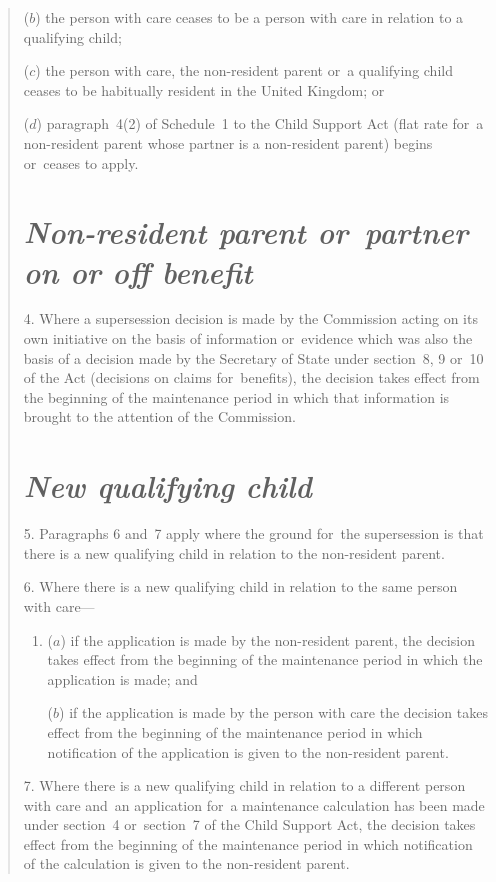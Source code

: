 \documentclass[12pt,a4paper]{article}
\begin{document}
\begin{quotation}
\begin{enumerate}
($b$) the person with care ceases to be a person with care in relation to a qualifying child;

($c$) the person with care, the non-resident parent or~a qualifying child ceases to be habitually resident in the United Kingdom; or

($d$) paragraph~4(2) of Schedule~1 to the Child Support Act (flat rate for~a non-resident parent whose partner is a non-resident parent) begins or~ceases to apply.
\end{enumerate}

\section*{\itshape Non-resident parent or~partner on or off benefit}

4.  Where a supersession decision is made by the Commission acting on its own initiative on the basis of information or~evidence which was also the basis of a decision made by the Secretary of State under section~8, 9 or~10 of the Act (decisions on claims for~benefits), the decision takes effect from the beginning of the maintenance period in which that information is brought to the attention of the Commission.

\section*{\itshape New qualifying child}

5.  Paragraphs 6 and~7 apply where the ground for~the supersession is that there is a new qualifying child in relation to the non-resident parent.

\medskip

6.  Where there is a new qualifying child in relation to the same person with care—
\begin{enumerate}\item[]
($a$) if the application is made by the non-resident parent, the decision takes effect from the beginning of the maintenance period in which the application is made; and

($b$) if the application is made by the person with care the decision takes effect from the beginning of the maintenance period in which notification of the application is given to the non-resident parent.
\end{enumerate}

\medskip

7.  Where there is a new qualifying child in relation to a different person with care and~an application for~a maintenance calculation has been made under section~4 or~section~7 of the Child Support Act, the decision takes effect from the beginning of the maintenance period in which notification of the calculation is given to the non-resident parent.


\end{quotation}
\end{document}
